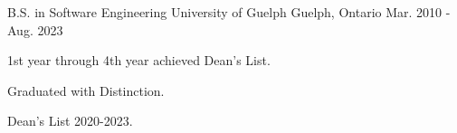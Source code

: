 


\begin{cventries}


\cventry
{B.S. in Software Engineering} %
{University of Guelph} %
{Guelph, Ontario} %
{Mar. 2010 - Aug. 2023} %
{ %
\begin{cvitems}
\item {1st year through 4th year achieved Dean's List.}
\item {Graduated with Distinction.}
\item {Dean's List 2020-2023.}
\end{cvitems}
}


\end{cventries}